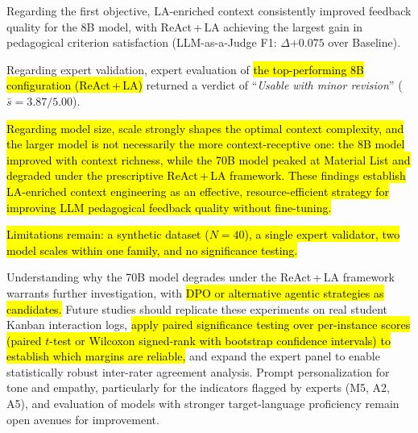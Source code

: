 \documentclass[conference,a4paper]{IEEEtran}
\begin{document}
Regarding the first objective, LA-enriched context
consistently improved feedback quality for the
8B model, with ReAct\,+\,LA achieving the
largest gain in pedagogical criterion
satisfaction (LLM-as-a-Judge F1:
$\Delta{+0.075}$ over Baseline).

Regarding expert validation, expert evaluation of
\hl{the top-performing 8B configuration (ReAct\,+\,LA)}
returned a verdict of
``\textit{Usable with minor revision}''
($\bar{s} = 3.87/5.00$).

\hl{Regarding model size, scale strongly shapes the
optimal context complexity, and the larger model is
not necessarily the more context-receptive one: the
8B model improved with context richness, while the
70B model peaked at Material List and degraded
under the prescriptive ReAct\,+\,LA framework. These
findings establish LA-enriched context engineering
as an effective, resource-efficient strategy for
improving LLM pedagogical feedback quality without
fine-tuning.}

\hl{Limitations remain: a synthetic dataset
(\mbox{$N = 40$}), a single expert validator, two model
scales within one family, and no significance
testing.}

Understanding why the 70B model degrades under the
ReAct\,+\,LA framework warrants further investigation, with
\hl{DPO or alternative agentic strategies as candidates.} Future studies should replicate these
experiments on real student Kanban interaction logs,
\hl{apply paired significance testing over per-instance
scores (paired \mbox{$t$}-test or Wilcoxon signed-rank with
bootstrap confidence intervals) to establish which
margins are reliable,} and expand the expert panel to
enable statistically robust inter-rater agreement
analysis. Prompt personalization
for tone and empathy, particularly for the indicators
flagged by experts (M5, A2, A5), and evaluation of models
with stronger target-language proficiency remain open
avenues for improvement.
\end{document}
